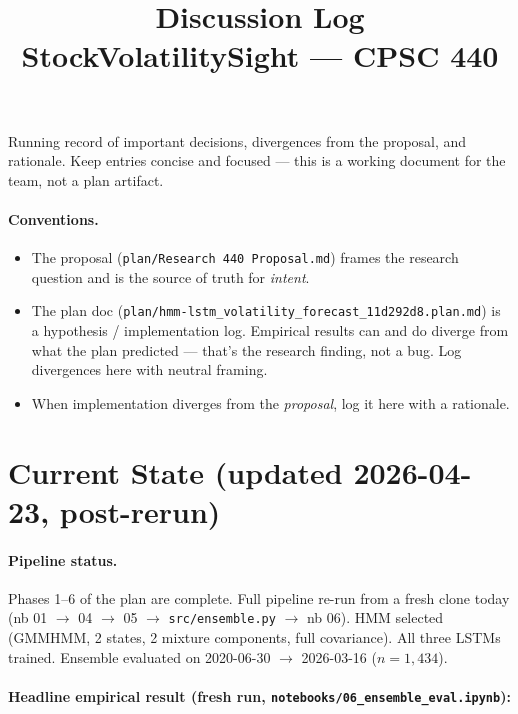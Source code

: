 \documentclass[11pt]{article}
\title{Discussion Log \\[0.3em] \large StockVolatilitySight --- CPSC 440}
\author{}
\date{}
\begin{document}
\maketitle

Running record of important decisions, divergences from the proposal, and rationale. Keep entries concise and focused --- this is a working document for the team, not a plan artifact.

\paragraph{Conventions.}
\begin{itemize}[leftmargin=*]
  \item The proposal (\texttt{plan/Research 440 Proposal.md}) frames the research question and is the source of truth for \emph{intent}.
  \item The plan doc (\texttt{plan/hmm-lstm\_volatility\_forecast\_11d292d8.plan.md}) is a hypothesis / implementation log. Empirical results can and do diverge from what the plan predicted --- that's the research finding, not a bug. Log divergences here with neutral framing.
  \item When implementation diverges from the \emph{proposal}, log it here with a rationale.
\end{itemize}

\hrulefill

\section*{Current State (updated 2026-04-23, post-rerun)}

\paragraph{Pipeline status.} Phases 1--6 of the plan are complete. Full pipeline re-run from a fresh clone today (nb 01 $\to$ 04 $\to$ 05 $\to$ \texttt{src/ensemble.py} $\to$ nb 06). HMM selected (GMMHMM, 2 states, 2 mixture components, full covariance). All three LSTMs trained. Ensemble evaluated on 2020-06-30 $\to$ 2026-03-16 ($n=1{,}434$).

\paragraph{Headline empirical result (fresh run, \texttt{notebooks/06\_ensemble\_eval.ipynb}):}
\end{document}
